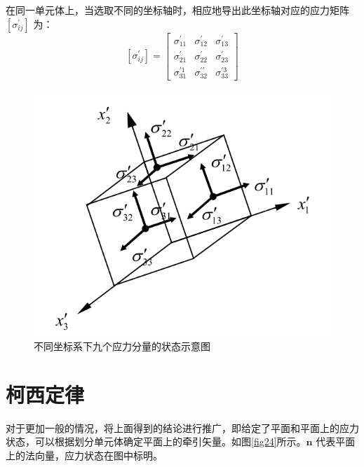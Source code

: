 \documentclass[12pt, a4paper]{ctexart}
\begin{document}
在同一单元体上，当选取不同的坐标轴时，相应地导出此坐标轴对应的应力矩阵 $ \left[\sigma_{i j}^{\prime}\right] $ 为：
\begin{equation}
\left[\sigma_{i j}^{\prime}\right]=\left[ \begin{array}{ccc}{\sigma_{11}^{\prime}} & {\sigma_{12}^{\prime}} & {\sigma_{13}^{\prime}} \\ {\sigma_{21}^{\prime}} & {\sigma_{22}^{\prime}} & {\sigma_{23}^{\prime}} \\ {\sigma_{31}^{\prime 1}} & {\sigma_{32}^{\prime \prime}} & {\sigma_{33}^{\prime 3}}\end{array}\right]
\end{equation}

\begin{figure}
	\centering
	\includegraphics[scale=0.8]{23.png}
	\caption{不同坐标系下九个应力分量的状态示意图}
	\label{fig23}
\end{figure}


\section{柯西定律}

对于更加一般的情况，将上面得到的结论进行推广，即给定了平面和平面上的应力状态，可以根据划分单元体确定平面上的牵引矢量。如图\ref{fig24}所示。$ \textbf{n} $ 代表平面上的法向量，应力状态在图中标明。
\end{document}
